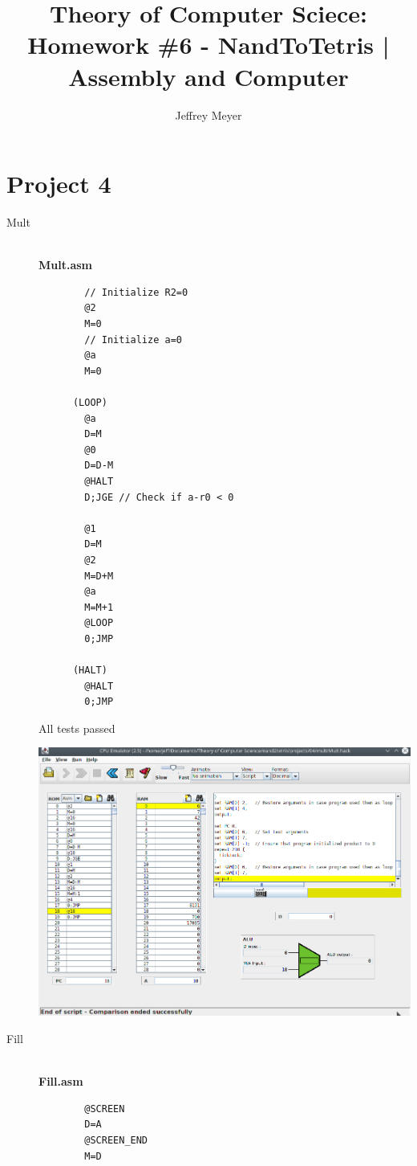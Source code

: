 \documentclass[titlepage]{article}
\author{Jeffrey Meyer}
\title{Theory of Computer Sciece: Homework \#6 - NandToTetris | Assembly and Computer}
\begin{document}
\maketitle

\newpage

\section{Project 4}

\begin{description}
  \item[Mult]{\\

    \textbf{Mult.asm}

    \begin{lstlisting}
        // Initialize R2=0
        @2
        M=0
        // Initialize a=0
        @a
        M=0

      (LOOP)
        @a
        D=M
        @0
        D=D-M
        @HALT
        D;JGE // Check if a-r0 < 0

        @1
        D=M
        @2
        M=D+M
        @a
        M=M+1
        @LOOP
        0;JMP

      (HALT)
        @HALT
        0;JMP
    \end{lstlisting}

    All tests passed

    \includegraphics[width=.9\textwidth]{mult.png}
  }
  \item[Fill]{\\

    \textbf{Fill.asm}

    \begin{lstlisting}
        @SCREEN
        D=A
        @SCREEN_END
        M=D


\end{lstlisting}}
\end{description}
\end{document}
